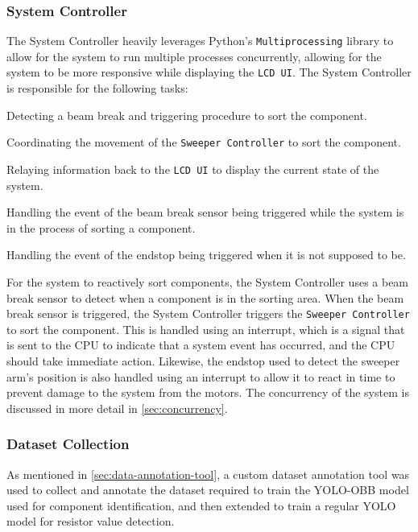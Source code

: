 \subsubsection{System Controller}
\label{sec:system-controller}
The System Controller heavily leverages Python's \texttt{Multiprocessing} library to allow for the system to run multiple processes concurrently, allowing for the system to be more responsive while displaying the \texttt{LCD UI}. The System Controller is responsible for the following tasks:

\begin{mylist}
    \item Detecting a beam break and triggering procedure to sort the component.
    \item Coordinating the movement of the \texttt{Sweeper Controller} to sort the component.
    \item Relaying information back to the \texttt{LCD UI} to display the current state of the system.
    \item Handling the event of the beam break sensor being triggered while the system is in the process of sorting a component.
    \item Handling the event of the endstop being triggered when it is not supposed to be.
\end{mylist}

For the system to reactively sort components, the System Controller uses a beam break sensor to detect when a component is in the sorting area. When the beam break sensor is triggered, the System Controller triggers the \texttt{Sweeper Controller} to sort the component. This is handled using an interrupt, which is a signal that is sent to the CPU to indicate that a system event has occurred, and the CPU should take immediate action. Likewise, the endstop used to detect the sweeper arm's position is also handled using an interrupt to allow it to react in time to prevent damage to the system from the motors. The concurrency of the system is discussed in more detail in \autoref{sec:concurrency}.

\subsubsection{Dataset Collection}
\label{sec:dataset-collection}
As mentioned in \autoref{sec:data-annotation-tool}, a custom dataset annotation tool was used to collect and annotate the dataset required to train the YOLO-OBB model used for component identification, and then extended to train a regular YOLO model for resistor value detection.


